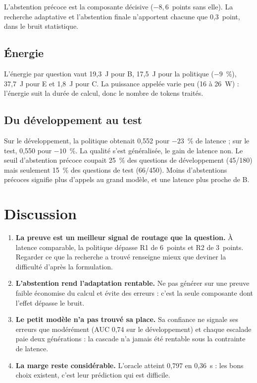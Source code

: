 \documentclass[11pt,a4paper]{article}
\begin{document}
L'abstention précoce est la composante décisive ($-8{,}6$~points sans elle). La recherche adaptative et
l'abstention finale n'apportent chacune que 0,3~point, dans le bruit statistique.

\subsection{Énergie}

L'énergie par question vaut 19,3~J pour B, 17,5~J pour la politique ($-9$~\%), 37,7~J pour E et 1,8~J
pour C. La puissance appelée varie peu (16 à 26~W) : l'énergie suit la durée de calcul, donc le nombre
de tokens traités.

\subsection{Du développement au test}

Sur le développement, la politique obtenait 0,552 pour $-23$~\% de latence ; sur le test, 0,550 pour
$-10$~\%. La qualité s'est généralisée, le gain de latence non. Le seuil d'abstention précoce coupait
25~\% des questions de développement (45/180) mais seulement 15~\% des questions de test (66/450).
Moins d'abstentions précoces signifie plus d'appels au grand modèle, et une latence plus proche de B.

\section{Discussion}

\begin{enumerate}
\item \textbf{La preuve est un meilleur signal de routage que la question.} À latence comparable, la
politique dépasse R1 de 6~points et R2 de 3~points. Regarder ce que la recherche a trouvé renseigne
mieux que deviner la difficulté d'après la formulation.
\item \textbf{L'abstention rend l'adaptation rentable.} Ne pas générer sur une preuve faible économise
du calcul et évite des erreurs : c'est la seule composante dont l'effet dépasse le bruit.
\item \textbf{Le petit modèle n'a pas trouvé sa place.} Sa confiance ne signale ses erreurs que
modérément (AUC 0,74 sur le développement) et chaque escalade paie deux générations : la cascade n'a
jamais été rentable sous la contrainte de latence.
\item \textbf{La marge reste considérable.} L'oracle atteint 0,797 en 0,36~s : les bons choix existent,
c'est leur prédiction qui est difficile.
\end{enumerate}
\end{document}
